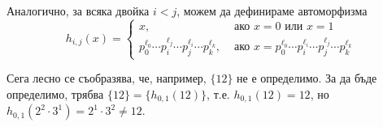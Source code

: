\begin{example}
  Аналогично, за всяка двойка $i < j$, можем да дефинираме автоморфизма
  \[h_{i,j}(x) =
    \begin{cases}
      x, & \text{ ако }x = 0 \text{ или } x = 1\\
      p^{\ell_0}_0 \cdots p_i^{\ell_j} \cdots p^{\ell_i}_j \cdots p^{\ell_k}_k, & \text{ ако }x = p^{\ell_0}_0 \cdots p^{\ell_i}_i \cdots p^{\ell_j}_j \cdots p^{\ell_k}_k
    \end{cases}
  \]
  
  Сега лесно се съобразява, че, например, $\{12\}$ не е определимо.
  За да бъде определимо, трябва $\{12\} = \{h_{0,1}(12)\}$, т.е. $h_{0,1}(12) = 12$, но
  $h_{0,1}(2^2 \cdot 3^1) = 2^1 \cdot 3^2 \neq 12$.

\end{example}



